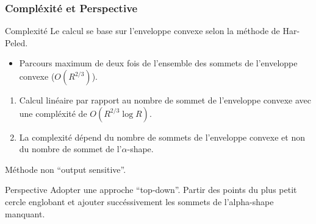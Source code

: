 \begin{frame}
\frametitle{Compléxité et Perspective}

\begin{block}{ Complexité}
  Le calcul se base sur l'enveloppe convexe selon la méthode de Har-Peled. 
  \begin{itemize}
    \item Parcours maximum de deux fois de l'ensemble des sommets de l'enveloppe convexe ($O(R^{2/3})$). 
  \end{itemize}
  
  \begin{enumerate}
    \item Calcul linéaire par rapport au nombre de sommet de l'enveloppe convexe avec une compléxité de $O(R^{2/3} \log R )$.
    \item La complexité dépend du nombre de sommets de l'enveloppe convexe et non du nombre de sommet de l'$\alpha$-shape.\\
  \end{enumerate}
  Méthode non ``output sensitive''. 
\end{block}

\begin{block}{Perspective}
  Adopter une approche ``top-down''. 
  Partir des points du plus petit cercle englobant et ajouter succéssivement les sommets de l'alpha-shape manquant. 
\end{block}
\end{frame}


